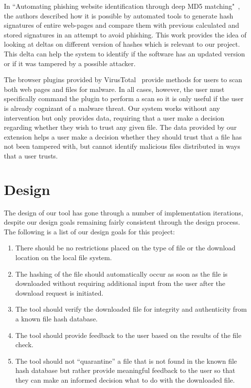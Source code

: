 \documentclass[letterpaper,twocolumn,10pt]{article}
\begin{document}
In ``Automating phishing website identification through deep MD5 matching"~\cite{Wardman}, the authors described how it is possible by automated tools to generate hash signatures of entire web-pages and compare them with previous calculated and stored signatures in an attempt to avoid phishing. This work  provides the idea of looking at deltas on different version of hashes which is relevant to our project. This delta can help the system to identify if the software has an updated version or if it was tampered by a possible attacker.

The browser plugins provided by VirusTotal~\cite{vtchromizer,vtexplorer,vtzilla} provide
methods for users to scan both web pages and files for malware. In all cases, however, the
user must specifically command the plugin to perform a scan so it is only useful if the user
is already cognizant of a malware threat. Our system works without any intervention
but only provides data, requiring that a user make a decision regarding whether they wish
to trust any given file. The data provided by our extension helps a user make a decision
whether they should trust that a file has not been tampered with, but cannot identify
malicious files distributed in ways that a user trusts.

\section{Design}

The design of our tool has gone through a number of implementation iterations, despite our design goals remaining fairly consistent through the design process. The following is a list of our design goals for this project:

\begin{enumerate}
\item There should be no restrictions placed on the type of file or the download location on the local file system.
\item The hashing of the file should automatically occur as soon as the file is downloaded without requiring additional input from the user after the download request is initiated.
\item The tool should verify the downloaded file for integrity and authenticity from a known file hash database.
\item The tool should provide feedback to the user based on the results of the file check.
\item The tool should not “quarantine” a file that is not found in the known file hash database but rather provide meaningful feedback to the user so that they can make an informed decision what to do with the downloaded file.
\end{enumerate}
\end{document}
